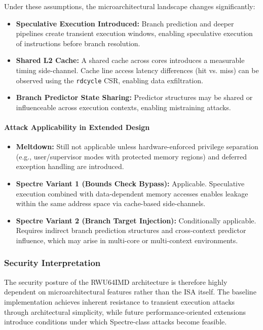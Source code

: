 Under these assumptions, the microarchitectural landscape changes significantly:

\begin{itemize}
  \item \textbf{Speculative Execution Introduced:} Branch prediction and deeper pipelines
        create transient execution windows, enabling speculative execution of instructions
        before branch resolution.
  \item \textbf{Shared L2 Cache:} A shared cache across cores introduces a measurable
        timing side-channel. Cache line access latency differences (hit vs. miss) can be
        observed using the \texttt{rdcycle} CSR, enabling data exfiltration.
  \item \textbf{Branch Predictor State Sharing:} Predictor structures may be shared or
        influenceable across execution contexts, enabling mistraining attacks.
\end{itemize}

\paragraph{Attack Applicability in Extended Design}

\begin{itemize}
  \item \textbf{Meltdown:} Still not applicable unless hardware-enforced privilege
        separation (e.g., user/supervisor modes with protected memory regions) and
        deferred exception handling are introduced.
  \item \textbf{Spectre Variant 1 (Bounds Check Bypass):} Applicable. Speculative
        execution combined with data-dependent memory accesses enables leakage within
        the same address space via cache-based side-channels.
  \item \textbf{Spectre Variant 2 (Branch Target Injection):} Conditionally applicable.
        Requires indirect branch prediction structures and cross-context predictor
        influence, which may arise in multi-core or multi-context environments.
\end{itemize}

\subsubsection*{Security Interpretation}

The security posture of the RWU64IMD architecture is therefore highly dependent on
microarchitectural features rather than the ISA itself. The baseline implementation
achieves inherent resistance to transient execution attacks through architectural
simplicity, while future performance-oriented extensions introduce conditions under
which Spectre-class attacks become feasible.

